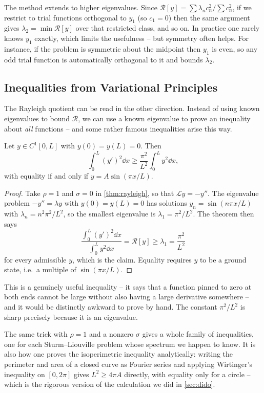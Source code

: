 \begin{remark}
	The method extends to higher eigenvalues. Since $\mathcal{R}[y] = \sum\lambda_n c_n^2/\sum c_n^2$, if we restrict to trial functions orthogonal to $y_1$ (so $c_1 = 0$) then the same argument gives $\lambda_2 = \min \mathcal{R}[y]$ over that restricted class, and so on. In practice one rarely knows $y_1$ exactly, which limits the usefulness -- but symmetry often helps. For instance, if the problem is symmetric about the midpoint then $y_1$ is even, so any odd trial function is automatically orthogonal to it and bounds $\lambda_2$.
\end{remark}

\subsection{Inequalities from Variational Principles}

The Rayleigh quotient can be read in the other direction. Instead of using known eigenvalues to bound $\mathcal{R}$, we can use a known eigenvalue to prove an inequality about \emph{all} functions -- and some rather famous inequalities arise this way.

\begin{theorem}
	Let $y \in C^1[0, L]$ with $y(0) = y(L) = 0$. Then
	$$
	\int_0^L (y')^2\dd x \geq \frac{\pi^2}{L^2}\int_0^L y^2 \dd x,
	$$
	with equality if and only if $y = A\sin(\pi x/L)$.
\end{theorem}
\begin{proof}
	Take $\rho = 1$ and $\sigma = 0$ in \autoref{thm:rayleigh}, so that $\mathcal{L}y = -y''$. The eigenvalue problem $-y'' = \lambda y$ with $y(0) = y(L) = 0$ has solutions $y_n = \sin(n\pi x/L)$ with $\lambda_n = n^2\pi^2/L^2$, so the smallest eigenvalue is $\lambda_1 = \pi^2/L^2$. The theorem then says
	$$
	\frac{\int_0^L (y')^2\dd x}{\int_0^L y^2\dd x} = \mathcal{R}[y] \geq \lambda_1 = \frac{\pi^2}{L^2}
	$$
	for every admissible $y$, which is the claim. Equality requires $y$ to be a ground state, i.e.\ a multiple of $\sin(\pi x/L)$.
\end{proof}

This is a genuinely useful inequality -- it says that a function pinned to zero at both ends cannot be large without also having a large derivative somewhere -- and it would be distinctly awkward to prove by hand. The constant $\pi^2/L^2$ is sharp precisely because it is an eigenvalue.

\begin{remark}
	The same trick with $\rho = 1$ and a nonzero $\sigma$ gives a whole family of inequalities, one for each Sturm--Liouville problem whose spectrum we happen to know. It is also how one proves the isoperimetric inequality analytically: writing the perimeter and area of a closed curve as Fourier series and applying Wirtinger's inequality on $[0, 2\pi]$ gives $L^2 \geq 4\pi A$ directly, with equality only for a circle -- which is the rigorous version of the calculation we did in \autoref{sec:dido}.
\end{remark}

